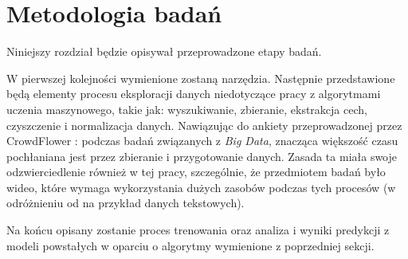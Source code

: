 
\chapter{Metodologia badań}
Niniejszy rozdział będzie opisywał przeprowadzone etapy badań. 

W pierwszej kolejności wymienione zostaną narzędzia. Następnie przedstawione będą elementy procesu eksploracji danych niedotyczące pracy z algorytmami uczenia maszynowego, takie jak: wyszukiwanie, zbieranie, ekstrakcja cech, czyszczenie i normalizacja danych. Nawiązując do ankiety przeprowadzonej przez CrowdFlower \cite{ds_report}: podczas badań związanych z {\em Big Data}, znacząca większość czasu pochłaniana jest przez zbieranie i przygotowanie danych. Zasada ta miała swoje odzwierciedlenie również w tej pracy, szczególnie, że przedmiotem badań było wideo, które wymaga wykorzystania dużych zasobów podczas tych procesów (w odróżnieniu od na przykład danych tekstowych). 

Na końcu opisany zostanie proces trenowania oraz analiza i wyniki predykcji z modeli powstałych w oparciu o algorytmy wymienione z poprzedniej sekcji.
\label{cha:pierwszyDokument}

